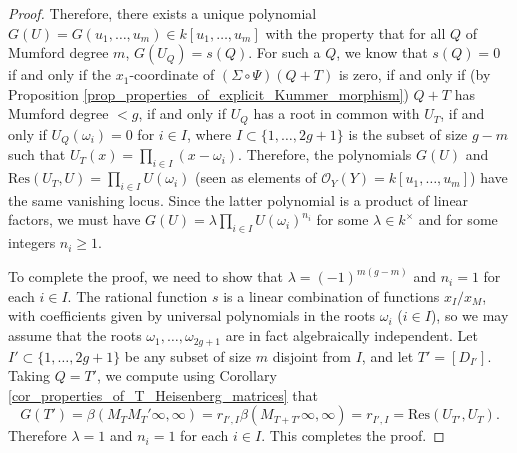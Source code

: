 \documentclass{article} %
\numberwithin{equation}{section}
\newcommand{\cO}{\mathcal{O}}
\begin{document}
\begin{proof}
Therefore, there exists a unique polynomial $G(U) = G(u_1, \dots, u_m) \in k[u_1, \dots, u_m]$ with the property that for all $Q$ of Mumford degree $m$, $G(U_Q) = s(Q)$. 
For such a $Q$, we know that $s(Q)=0$ if and only if the $x_1$-coordinate of $(\Sigma\circ\Psi)(Q + T)$ is zero, if and only if (by Proposition \ref{prop_properties_of_explicit_Kummer_morphism}) $Q+T$ has Mumford degree $<g$, if and only if $U_Q$ has a root in common with $U_T$, if and only if $U_Q(\omega_i)=0$ for $i \in I$, where $I \subset \{ 1, \dots, 2g+1 \}$ is the subset of size $g-m$ such that $U_T(x) = \prod_{i \in I}(x - \omega_i)$. Therefore, the polynomials $G(U)$ and $\mathrm{Res}(U_T, U) = \prod_{i\in I} U(\omega_i)$ (seen as elements of $\cO_Y(Y) = k[u_1, \dots, u_m]$) have the same vanishing locus. Since the latter polynomial is a product of linear factors, we must have $G(U) = \lambda \prod_{i\in I} U(\omega_i)^{n_i}$ for some $\lambda \in k^{\times}$ and for some integers $n_i\geq 1$. 

To complete the proof, we need to show that $\lambda = (-1)^{m(g-m)}$ and $n_i = 1$ for each $i \in I$. The rational function $s$ is a linear combination of functions $x_I / x_M$, with coefficients given by universal polynomials in the roots $\omega_i$ ($i \in I$), so we may assume that the roots $\omega_1, \dots, \omega_{2g+1}$ are in fact algebraically independent. 
Let $I'\subset \{1, \dots, 2g+1\}$ be any subset of size $m$ disjoint from $I$, and let $T' = [D_{I'}]$. Taking $Q = T'$, we compute using Corollary \ref{cor_properties_of_T_Heisenberg_matrices} that
\[ G(T') = \beta(M_T M_T' \infty, \infty) = r_{I', I} \beta(M_{T + T'} \infty, \infty) = r_{I' , I} = \mathrm{Res}(U_{T'}, U_T). \]
Therefore $\lambda = 1$ and $n_i = 1$ for each $i \in I$. This completes the proof. 
\end{proof}
\end{document}
